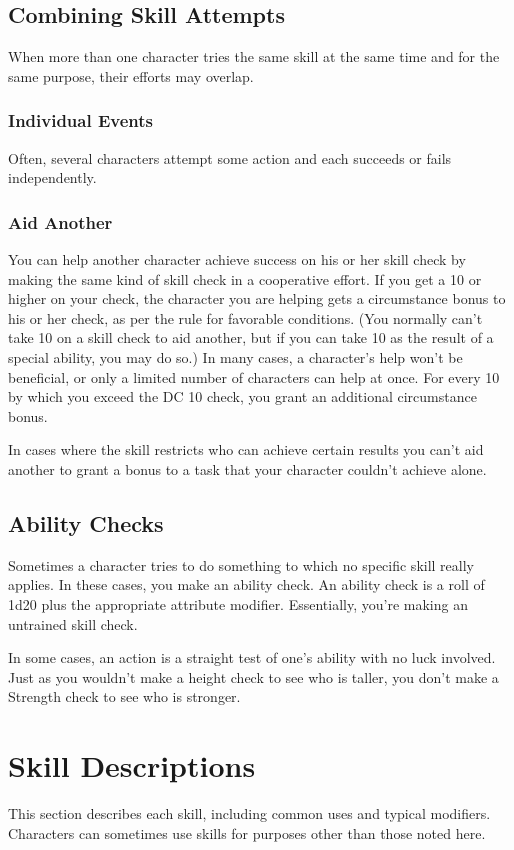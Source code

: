 \subsection{Combining Skill Attempts}
When more than one character tries the same skill at the same time
and for the same purpose, their efforts may overlap.

\subsubsection{Individual Events}
Often, several characters attempt some action and each succeeds or
fails independently.

\subsubsection{Aid Another}
You can help another character achieve success on his or her skill check by making the same kind of skill check in a cooperative effort. If you get a 10 or higher on your check, the character you are helping gets a  circumstance bonus to his or her check, as per the rule for favorable conditions. (You normally can't take 10 on a skill check to aid another, but if you can take 10 as the result of a special ability, you may do so.) In many cases, a character's help won't be beneficial, or only a limited number of characters can help at once. For every 10 by which you exceed the DC 10 check, you grant an additional  circumstance bonus.

In cases where the skill restricts who can achieve certain results you can't aid another to grant a bonus to a task that your character couldn't achieve alone.

\subsection{Ability Checks}
Sometimes a character tries to do something to which no specific skill really applies. In these cases, you make an ability check. An ability check is a roll of 1d20 plus the appropriate attribute modifier. Essentially, you're making an untrained skill check.

In some cases, an action is a straight test of one's ability with no luck involved. Just as you wouldn't make a height check to see who is taller, you don't make a Strength check to see who is stronger.

\section{Skill Descriptions}
This section describes each skill, including common uses and typical modifiers. Characters can sometimes use skills for purposes other than those noted here.


